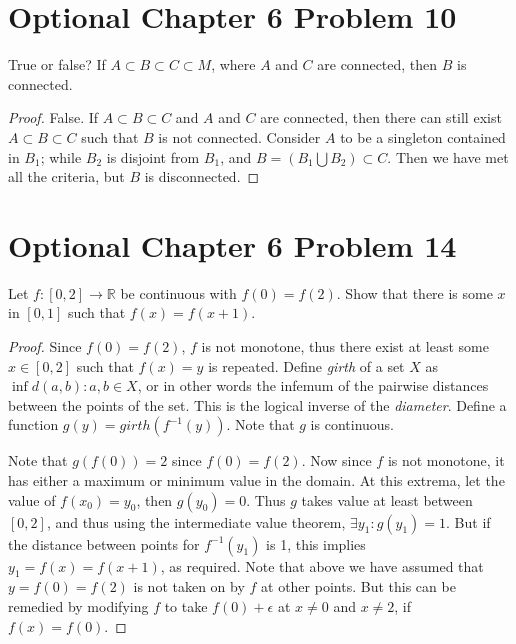 \documentclass{article}
\newtheorem{proof}{Proof}
\def\to{\rightarrow}
\def\RR{\mathbb R}
\begin{document}
\section{Optional Chapter 6 Problem 10}
True or false? If $A\subset B \subset C \subset M$, where
$A$ and $C$ are connected, then $B$ is connected.
\begin{proof}
False. If $A\subset B \subset C$ and $A$ and $C$ are connected, then
there can still exist $A\subset B\subset C$ such that $B$ is not connected.
Consider $A$ to be a singleton contained in $B_1$;
while $B_2$ is disjoint from $B_1$, and
$B=(B_1\bigcup B_2)\subset C$. Then we have met all the criteria, but $B$ is disconnected.
\end{proof}
\section{Optional Chapter 6 Problem 14}
Let $f:[0,2]\to \RR$ be continuous with $f(0)=f(2)$. Show that
there is some $x$ in $[0,1]$ such that $f(x)=f(x+1)$.
\begin{proof}
Since $f(0)=f(2)$, $f$ is not monotone, thus there exist at least some
$x\in[0,2]$ such that $f(x)=y$ is repeated. Define \emph{girth} of
a set $X$ as $\inf d(a,b):a,b\in X$, or in other words the infemum
of the pairwise distances between the points of the set. This
is the logical inverse of the \emph{diameter}. Define a function
$g(y)=girth(f^{-1}(y))$.  Note that $g$ is continuous.

Note that $g(f(0))=2$ since $f(0)=f(2)$. Now since $f$ is not
monotone, it has either a maximum or minimum value in the domain.
At this extrema, let the value of $f(x_0)=y_0$, then $g(y_0)=0$.
Thus $g$ takes value at least between $[0,2]$, and thus using the
intermediate value theorem, $\exists y_1:g(y_1)=1$. But if the
distance between points for $f^{-1}(y_1)$ is 1, 
this implies $y_1=f(x)=f(x+1)$, as
required. Note that above we have assumed that $y=f(0)=f(2)$ is not
taken on by $f$ at other points. But this can be remedied by modifying
$f$ to take $f(0)+\epsilon$ at $x\ne 0$ and $x\ne 2$, if $f(x)=f(0)$.

\end{proof}
\end{document}
